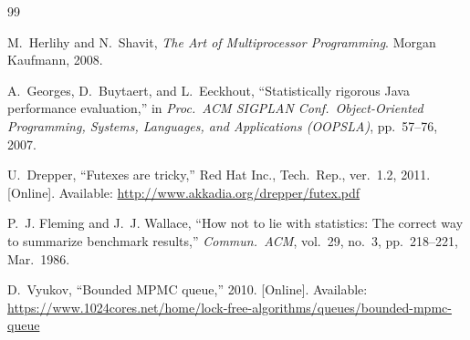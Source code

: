 \documentclass[conference]{IEEEtran}
\begin{document}
\begin{thebibliography}{99}

M.~Herlihy and N.~Shavit,
\textit{The Art of Multiprocessor Programming}.
Morgan Kaufmann, 2008.

A.~Georges, D.~Buytaert, and L.~Eeckhout,
``Statistically rigorous Java performance evaluation,''
in \textit{Proc.\ ACM SIGPLAN Conf.\ Object-Oriented Programming,
Systems, Languages, and Applications (OOPSLA)},
pp.~57--76, 2007.

U.~Drepper,
``Futexes are tricky,''
Red Hat Inc., Tech.\ Rep., ver.~1.2, 2011.
[Online]. Available: \url{http://www.akkadia.org/drepper/futex.pdf}

P.~J. Fleming and J.~J. Wallace,
``How not to lie with statistics: The correct way to summarize
benchmark results,''
\textit{Commun.~ACM}, vol.~29, no.~3, pp.~218--221, Mar.~1986.

D.~Vyukov,
``Bounded MPMC queue,'' 2010.
[Online]. Available:
\url{https://www.1024cores.net/home/lock-free-algorithms/queues/bounded-mpmc-queue}

\end{thebibliography}
\end{document}
